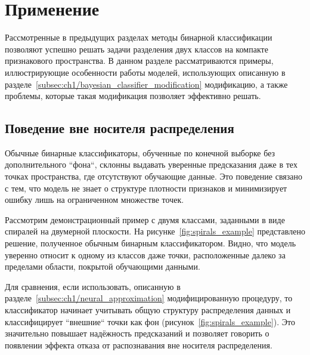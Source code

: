\section{Применение}\label{sec:ch1/application}

Рассмотренные в предыдущих разделах методы бинарной классификации позволяют успешно решать задачи разделения двух классов на компакте признакового пространства. В данном разделе рассматриваются примеры, иллюстрирующие особенности работы моделей, использующих описанную в разделе~\cref{subsec:ch1/bayesian_classifier_modification} модификацию, а также проблемы, которые такая модификация позволяет эффективно решать.

\subsection{Поведение вне носителя распределения}

Обычные бинарные классификаторы, обученные по конечной выборке без дополнительного ``фона``, склонны выдавать уверенные предсказания даже в тех точках пространства, где отсутствуют обучающие данные. Это поведение связано с тем, что модель не знает о структуре плотности признаков и минимизирует ошибку лишь на ограниченном множестве точек.

Рассмотрим демонстрационный пример с двумя классами, заданными в виде спиралей на двумерной плоскости. На рисунке~\cref{fig:spirals_example} представлено решение, полученное обычным бинарным классификатором. Видно, что модель уверенно относит к одному из классов даже точки, расположенные далеко за пределами области, покрытой обучающими данными.

Для сравнения, если использовать, описанную в разделе~\cref{subsec:ch1/neural_approximation} модифицированную процедуру, то классификатор начинает учитывать общую структуру распределения данных и классифицирует ``внешние`` точки как фон (рисунок~\cref{fig:spirals_example}). Это значительно повышает надёжность предсказаний и позволяет говорить о появлении эффекта отказа от распознавания вне носителя распределения.

